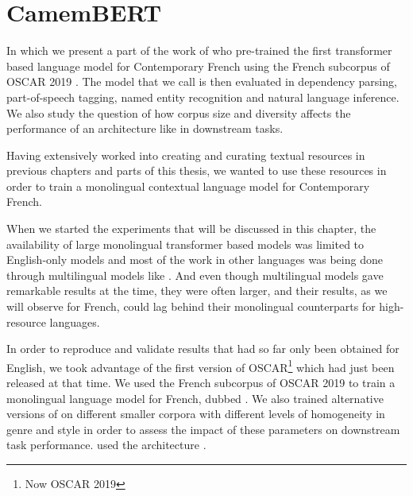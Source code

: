\chapter{CamemBERT}\label{chap:camembert}

\begin{center}
    \begin{minipage}{0.66\textwidth}
        \begin{small}
            In which we present a part of the work of \citet{martin-etal-2020-camembert} who pre-trained the first transformer based language model for Contemporary French using the French subcorpus of OSCAR 2019 \citep{ortiz-suarez-etal-2019-asynchronous,ortiz-suarez-etal-2020-monolingual}. The model that we call \camembert is then evaluated in dependency parsing, part-of-speech tagging, named entity recognition and natural language inference. We also study the question of how corpus size and diversity affects the performance of an architecture like \roberta \citep{liu-etal-2019-roberta} in downstream tasks.
        \end{small}
    \end{minipage}
    \vspace{0.5cm}
\end{center}

Having extensively worked into creating and curating textual resources in previous chapters and parts of this thesis, we wanted to use these resources in order to train a monolingual contextual language model for Contemporary French.

When we started the experiments that will be discussed in this chapter, the availability of large monolingual transformer based models was limited to English-only models \citep{devlin-etal-2019-bert,radford-etal-2019-language,liu-etal-2019-roberta,yang-etal-2019-xlnet,raffel-etal-2020-exploring} and most of the work in other languages was being done through multilingual models like \mbert \citep{devlin-etal-2019-bert}. And even though multilingual models gave remarkable results at the time, they were often larger, and their results, as we will observe for French, could lag behind their monolingual counterparts for high-resource languages.

In order to reproduce and validate results that had so far only been obtained for English, we took advantage of the first version of OSCAR\footnote{Now OSCAR 2019} \citep{ortiz-suarez-etal-2019-asynchronous} which had just been released at that time. We used the French subcorpus of OSCAR 2019 to train a monolingual language model for French, dubbed \camembert. We also trained alternative versions of \camembert on different smaller corpora with different levels of homogeneity in genre and style in order to assess the impact of these parameters on downstream task performance.
\camembert used the \roberta architecture \citep{liu-etal-2019-roberta}.


